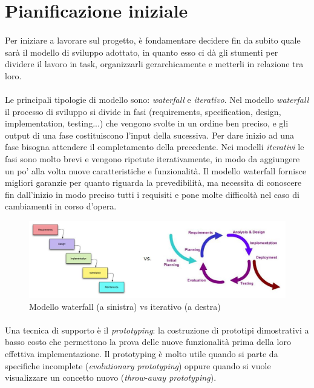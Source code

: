 \documentclass[11pt,a4paper,english]{article}
\begin{document}
\section{Pianificazione iniziale}

\paragraph{} Per iniziare a lavorare sul progetto, è fondamentare decidere fin da subito quale sarà il modello di sviluppo adottato, in quanto esso ci dà gli stumenti per dividere il lavoro in task, organizzarli gerarchicamente e metterli in relazione tra loro. 

\paragraph{} Le principali tipologie di modello sono: \emph{waterfall} e \emph{iterativo}. Nel modello \emph{waterfall} il processo di sviluppo si divide in fasi (requirements, specification, design, implementation, testing...) che vengono svolte in un ordine ben preciso, e gli output di una fase costituiscono l'input della sucessiva. Per dare inizio ad una fase bisogna attendere il completamento della precedente. Nei modelli \emph{iterativi} le fasi sono molto brevi e vengono ripetute iterativamente, in modo da aggiungere un po' alla volta nuove caratteristiche e funzionalità. Il modello waterfall fornisce migliori garanzie per quanto riguarda la prevedibilità, ma necessita di conoscere fin dall'inizio in modo preciso tutti i requisiti e pone molte difficoltà nel caso di cambiamenti in corso d'opera.

\begin{figure}[H]
    \centering
    \includegraphics[width=1.0\textwidth]{img/waterfall_vs_iterativo.jpeg}
    \caption{Modello waterfall (a sinistra) vs iterativo (a destra)}
\end{figure}

\paragraph{} Una tecnica di supporto è il \emph{prototyping}: la costruzione di prototipi dimostrativi a basso costo che permettono la prova delle nuove funzionalità prima della loro effettiva implementazione. Il prototyping è molto utile quando si parte da specifiche incomplete (\emph{evolutionary prototyping}) oppure quando si vuole visualizzare un concetto nuovo (\emph{throw-away prototyping}). 
\end{document}
